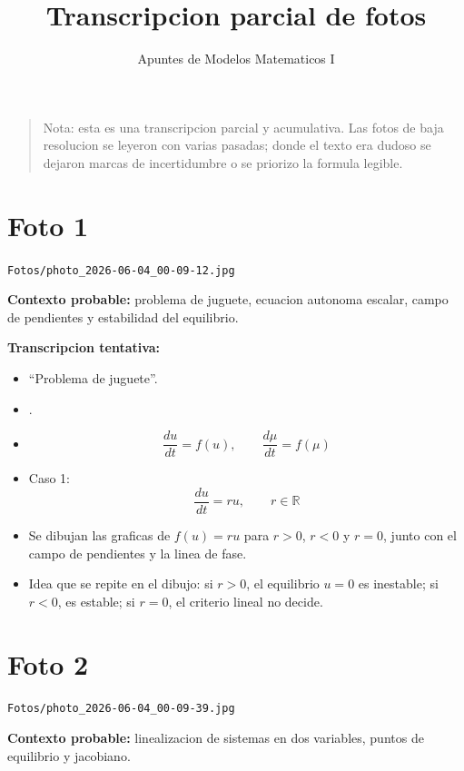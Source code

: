 \documentclass[11pt,letterpaper]{article}
\title{Transcripcion parcial de fotos}
\author{Apuntes de Modelos Matematicos I}
\date{}
\begin{document}
\maketitle

\begin{quote}
Nota: esta es una transcripcion parcial y acumulativa. Las fotos de baja resolucion
se leyeron con varias pasadas; donde el texto era dudoso se dejaron marcas de
incertidumbre o se priorizo la formula legible.
\end{quote}

\section*{Foto 1}
\texttt{Fotos/photo\_2026-06-04\_00-09-12.jpg}

\textbf{Contexto probable:} problema de juguete, ecuacion autonoma escalar, campo de pendientes y estabilidad del equilibrio.

\textbf{Transcripcion tentativa:}
\begin{itemize}[leftmargin=*]
    \item ``Problema de juguete''.
    \item [Texto superior izquierdo muy borroso; solo se distinguen fragmentos como ``Decimos que...''].
    \item \[
    \frac{du}{dt}=f(u), \qquad \frac{d\mu}{dt}=f(\mu)
    \]
    \item Caso 1:
    \[
    \frac{du}{dt}=ru, \qquad r\in\mathbb{R}
    \]
    \item Se dibujan las graficas de \(f(u)=ru\) para \(r>0\), \(r<0\) y \(r=0\), junto con el campo de pendientes y la linea de fase.
    \item Idea que se repite en el dibujo: si \(r>0\), el equilibrio \(u=0\) es inestable; si \(r<0\), es estable; si \(r=0\), el criterio lineal no decide.
\end{itemize}

\section*{Foto 2}
\texttt{Fotos/photo\_2026-06-04\_00-09-39.jpg}

\textbf{Contexto probable:} linealizacion de sistemas en dos variables, puntos de equilibrio y jacobiano.
\end{document}
